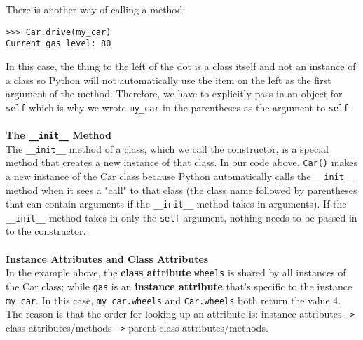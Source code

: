 There is another way of calling a method:
\begin{lstlisting}
>>> Car.drive(my_car)
Current gas level: 80
\end{lstlisting}
In this case, the thing to the left of the dot is a class itself and not an instance of a class so Python will not automatically use the item on the left as the first argument of the method. Therefore, we have to explicitly pass in an object for \lstinline{self} which is why we wrote \lstinline{my_car} in the parentheses as the argument to \lstinline{self}. \\
\\
\textbf{The \lstinline{__init__} Method} \\
The \lstinline{__init__} method of a class, which we call the constructor, is a special method that creates a new instance of that class. In our code above, \lstinline{Car()} makes a new instance of the Car class because Python automatically calls the \lstinline{__init__} method when it sees a "call" to that class (the class name followed by parentheses that can contain arguments if the \lstinline{__init__} method takes in arguments). If the \lstinline{__init__} method takes in only the \lstinline{self} argument, nothing needs to be passed in to the constructor. \\
\\
\textbf{Instance Attributes and Class Attributes} \\
In the example above, the \textbf{class attribute} \lstinline{wheels} is shared by all instances of the Car class; while \lstinline{gas} is an \textbf{instance attribute} that’s specific to the instance \lstinline{my_car}.
In this case, \lstinline{my_car.wheels} and \lstinline{Car.wheels} both return the value 4. The reason is that the order for looking up an attribute is: instance attributes \lstinline{->} class attributes/methods \lstinline{->} parent class attributes/methods. \\
